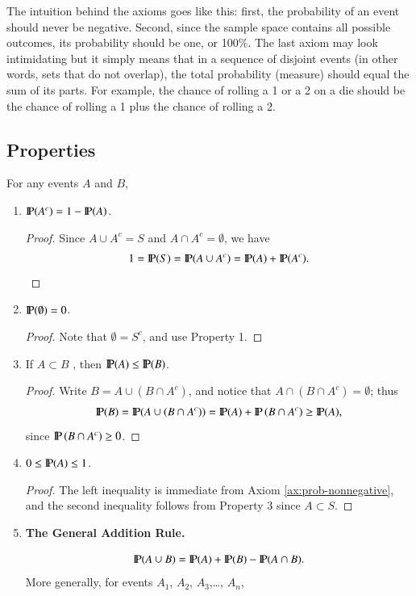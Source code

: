 \documentclass[captions=tableheading]{scrbook}
\begin{document}
The intuition behind the axioms goes like this: first, the probability of an event should never be negative. Second, since the sample space contains all possible outcomes, its probability should be one, or 100\%. The last axiom may look intimidating but it simply means that in a sequence of disjoint events (in other words, sets that do not overlap), the total probability (measure) should equal the sum of its parts. For example, the chance of rolling a 1 or a 2 on a die should be the chance of rolling a 1 plus the chance of rolling a 2.
\subsection{Properties}
\label{sec-3-4-2}


For any events \(A\) and \(B\),

\begin{enumerate}
\item \(\P(A^{c})=1-\P(A)\).\label{enu:prop-prob-complement} 

  \begin{proof}
  Since \(A\cup A^{c}=S\) and \(A\cap A^{c}=\emptyset\), we have
  \[
  1=\P(S)=\P(A\cup A^{c})=\P(A)+\P(A^{c}).
  \]
  \end{proof}
\item \(\P(\emptyset)=0\).

  \begin{proof}
  Note that \(\emptyset=S^{c}\), and use Property 1.
  \end{proof}
\item If \(A\subset B\) , then \(\P(A)\leq\P(B)\).

  \begin{proof}
  Write \(B=A\cup\left(B\cap A^{c}\right)\), and notice that \(A\cap\left(B\cap A^{c}\right)=\emptyset\); thus
  \[
  \P(B)=\P(A\cup\left(B\cap A^{c}\right))=\P(A)+\P\left(B\cap A^{c}\right)\geq\P(A),
  \]
  since \(\P\left(B\cap A^{c}\right)\ge0\). 
  \end{proof}
\item \(0\leq\P(A)\leq1\).

  \begin{proof}
  The left inequality is immediate from Axiom \ref{ax:prob-nonnegative}, and the second inequality follows from Property 3 since \(A\subset S\).
  \end{proof}
\item \textbf{The General Addition Rule.}

  \begin{equation}
  \P(A\cup B)=\P(A)+\P(B)-\P(A\cap B).\label{eq:general-addition-rule-1}
  \end{equation}
  More generally, for events \(A_{1}\), \(A_{2}\), \(A_{3}\),\ldots{}, \(A_{n}\),


\end{enumerate}
\end{document}
